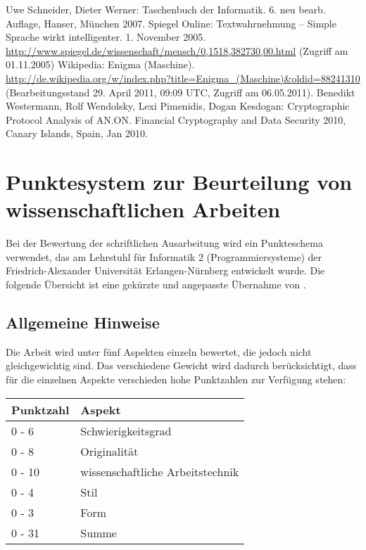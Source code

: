 \documentclass[12pt]{scrartcl}
\begin{document}
\begin{raggedright}
\begin{thebibliography}{XXXXXXXX}
	 Uwe Schneider, Dieter Werner: Taschenbuch der Informatik. 6. neu bearb. Auflage, Hanser, München 2007.
	 Spiegel Online: Textwahrnehmung -- Simple Sprache wirkt intelligenter. 1. November 2005. \url{http://www.spiegel.de/wissenschaft/mensch/0,1518,382730,00.html} (Zugriff am 01.11.2005)
	 Wikipedia: Enigma (Maschine). \url{http://de.wikipedia.org/w/index.php?title=Enigma_(Maschine)&oldid=88241310} (Bearbeitungsstand 29. April 2011, 09:09 UTC, Zugriff am 06.05.2011).
	 Benedikt Westermann, Rolf Wendolsky, Lexi Pimenidis, Dogan Kesdogan: Cryptographic Protocol Analysis of AN.ON. Financial Cryptography and Data Security 2010, Canary Islands, Spain, Jan 2010.
\end{thebibliography}
\end{raggedright}

\newpage
{}

\section*{Punktesystem zur Beurteilung von wissenschaftlichen Arbeiten}

Bei der Bewertung der schriftlichen Ausarbeitung wird ein Punkteschema verwendet, das am Lehrstuhl für Informatik 2 (Programmiersysteme) der Friedrich-Alexander Universität Erlangen-Nürnberg entwickelt wurde. Die folgende Übersicht ist eine gekürzte und angepasste Übernahme von \cite{faui2}.

\subsection*{Allgemeine Hinweise}

Die Arbeit wird unter fünf Aspekten einzeln bewertet, die jedoch nicht gleichgewichtig sind. Das verschiedene Gewicht wird dadurch berücksichtigt, dass für die einzelnen Aspekte verschieden hohe Punktzahlen zur Verfügung stehen:
\begin{center}
	\begin{tabular}{lp{8cm}} 
		\hline
	Punktzahl & Aspekt\\ \hline
	0 - 6 &  Schwierigkeitsgrad\\
	0 - 8 &  Originalität\\
	0 - 10 & wissenschaftliche Arbeitstechnik\\
	0 - 4 &  Stil\\
	0 - 3 &  Form\\
	0 - 31 & Summe\\
	\hline
	\end{tabular}	
\end{center}
\end{document}
